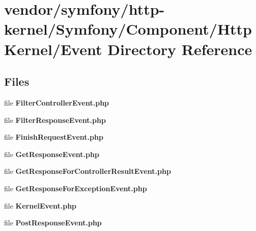 \section{vendor/symfony/http-\/kernel/\+Symfony/\+Component/\+Http\+Kernel/\+Event Directory Reference}
\label{dir_eacb85bdd75c27d8ff4806cb331f6572}
\subsection*{Files}
\begin{DoxyCompactItemize}
\item 
file {\bf Filter\+Controller\+Event.\+php}
\item 
file {\bf Filter\+Response\+Event.\+php}
\item 
file {\bf Finish\+Request\+Event.\+php}
\item 
file {\bf Get\+Response\+Event.\+php}
\item 
file {\bf Get\+Response\+For\+Controller\+Result\+Event.\+php}
\item 
file {\bf Get\+Response\+For\+Exception\+Event.\+php}
\item 
file {\bf Kernel\+Event.\+php}
\item 
file {\bf Post\+Response\+Event.\+php}
\end{DoxyCompactItemize}
